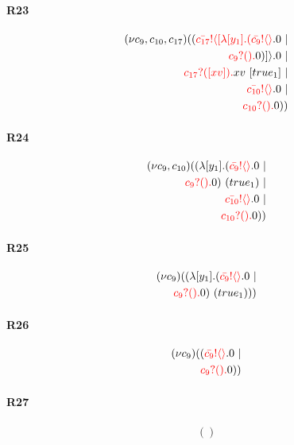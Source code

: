 \documentclass{article}
\begin{document}
\paragraph{R23}
\begin{align*}
 (\nu c_{9},c_{10},c_{17})((\color{red}\bar{c_{17}}! \langle [ \lambda [y_{1}].(\color{red}\bar{c_{9}}! \langle  \rangle \color{black}.0  \ | \\ \color{red}c_{9}?().\color{black}0 )] \rangle \color{black}.0  \ | \\ \color{red}c_{17}?([xv]).\color{black}xv \ [true_{1}] \ | \\ \color{red}\bar{c_{10}}! \langle  \rangle \color{black}.0  \ | \\ \color{red}c_{10}?().\color{black}0 ))
\end{align*}
\paragraph{R24}
\begin{align*}
 (\nu c_{9},c_{10})(( \lambda [y_{1}].(\color{red}\bar{c_{9}}! \langle  \rangle \color{black}.0  \ | \\ \color{red}c_{9}?().\color{black}0 ) \ (true_{1}) \ | \\ \color{red}\bar{c_{10}}! \langle  \rangle \color{black}.0  \ | \\ \color{red}c_{10}?().\color{black}0 ))
\end{align*}
\paragraph{R25}
\begin{align*}
 (\nu c_{9})(( \lambda [y_{1}].(\color{red}\bar{c_{9}}! \langle  \rangle \color{black}.0  \ | \\ \color{red}c_{9}?().\color{black}0 ) \ (true_{1})))
\end{align*}
\paragraph{R26}
\begin{align*}
 (\nu c_{9})((\color{red}\bar{c_{9}}! \langle  \rangle \color{black}.0  \ | \\ \color{red}c_{9}?().\color{black}0 ))
\end{align*}
\paragraph{R27}
\begin{align*}
()
\end{align*}
\end{document}
